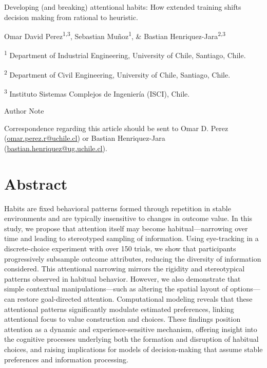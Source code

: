 Developing (and breaking) attentional habits: How extended training shifts decision making from rational to heuristic.

Omar David Perez\textsuperscript{1,3}, Sebastian Muñoz\textsuperscript{1}, \& Bastian Henriquez-Jara\textsuperscript{2,3}

\textsuperscript{1} Department of Industrial Engineering, University of Chile, Santiago, Chile.

\textsuperscript{2} Department of Civil Engineering, University of Chile, Santiago, Chile.

\textsuperscript{3} Instituto Sistemas Complejos de Ingeniería (ISCI), Chile.

Author Note

Correspondence regarding this article should be sent to Omar D. Perez (\href{mailto:omar.perez.r@uchile.cl}{\ul{omar.perez.r@uchile.cl}}) or Bastian Henriquez-Jara (\href{mailto:bastian.henriquez@ug.uchile.cl}{\ul{bastian.henriquez@ug.uchile.cl}}).

\section{}\label{section}

\section{Abstract}\label{abstract}

Habits are fixed behavioral patterns formed through repetition in stable environments and are typically insensitive to changes in outcome value. In this study, we propose that attention itself may become habitual---narrowing over time and leading to stereotyped sampling of information. Using eye-tracking in a discrete-choice experiment with over 150 trials, we show that participants progressively subsample outcome attributes, reducing the diversity of information considered. This attentional narrowing mirrors the rigidity and stereotypical patterns observed in habitual behavior. However, we also demonstrate that simple contextual manipulations---such as altering the spatial layout of options---can restore goal-directed attention. Computational modeling reveals that these attentional patterns significantly modulate estimated preferences, linking attentional focus to value construction and choices. These findings position attention as a dynamic and experience-sensitive mechanism, offering insight into the cognitive processes underlying both the formation and disruption of habitual choices, and raising implications for models of decision-making that assume stable preferences and information processing.

